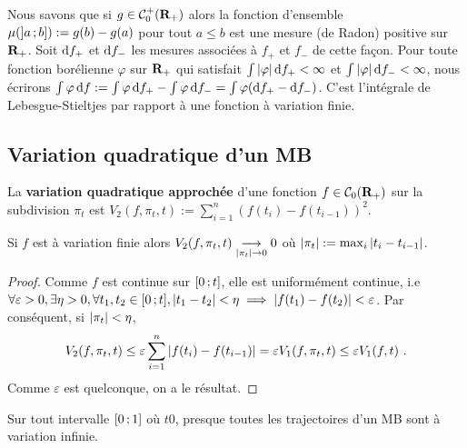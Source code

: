 	Nous savons que si $g \in \mathcal{C}_0^+(\mathbf{R}_+)$ alors la fonction d'ensemble $\mu(\mathopen{}\mathclose{\left]a\mathclose{}\mathpunct{};b\right]}) := g(b) - g(a)$ pour tout $a \leq b$ est une mesure (de Radon) positive sur $\mathbf{R}_+$.
	Soit $\mathop{}\mathopen{}\mathrm{d} f_+$ et $\mathop{}\mathopen{}\mathrm{d} f_-$ les mesures associées à $f_+$ et $f_-$ de cette façon.
	Pour toute fonction borélienne $\varphi$ sur $\mathbf{R}_+$ qui satisfait $\int \left\lvert\varphi\right\rvert \mathop{}\mathopen{}\mathrm{d} f_+ < \infty$ et $\int \left\lvert\varphi\right\rvert \mathop{}\mathopen{}\mathrm{d} f_- < \infty$, nous écrirons $\int \varphi \mathop{}\mathopen{}\mathrm{d} f := \int \varphi \mathop{}\mathopen{}\mathrm{d} f_+ - \int \varphi \mathop{}\mathopen{}\mathrm{d} f_- = \int \varphi (\mathop{}\mathopen{}\mathrm{d} f_+ - \mathop{}\mathopen{}\mathrm{d} f_-)$.
	C'est l'intégrale de Lebesgue-Stieltjes par rapport à une fonction à variation finie.


\subsection{Variation quadratique d'un MB}

	\begin{defn}
		La \textbf{variation quadratique approchée} d'une fonction $f \in \mathcal{C}_0(\mathbf{R}_+)$ sur la subdivision $\pi_t$ est $V_2(f,\pi_t,t) := \sum_{i = 1}^n (f(t_i) - f(t_{i-1}))^2$.
	\end{defn}
	
	\begin{pop}
		Si $f$ est à variation finie alors $V_2(f,\pi_t,t) \underset{\left\lvert\pi_t\right\rvert \to 0}{\longrightarrow} 0$ où $\left\lvert\pi_t\right\rvert := \max_i \left\lvert t_i - t_{i-1}\right\rvert$.
	\end{pop}
	
	\begin{proof}
		Comme $f$ est continue sur $\mathopen{}\mathclose{\left[0\mathclose{}\mathpunct{};t\right]}$, elle est uniformément continue, i.e $\forall \varepsilon > 0, \exists \eta > 0, \forall t_1,t_2 \in \mathopen{}\mathclose{\left[0\mathclose{}\mathpunct{};t\right]}, \left\lvert t_1 - t_2\right\rvert < \eta \implies \left\lvert f(t_1) - f(t_2)\right\rvert < \varepsilon$.
		Par conséquent, si $\left\lvert\pi_t\right\rvert < \eta$,
		$$V_2(f,\pi_t,t) \leq \varepsilon \sum_{i = 1}^n \left\lvert f(t_i) - f(t_{i-1})\right\rvert = \varepsilon V_1(f,\pi_t,t) \leq \varepsilon V_1(f,t)\ .$$
		Comme $\varepsilon$ est quelconque, on a le résultat.
	\end{proof}
	
	\begin{thm}
		Sur tout intervalle $\mathopen{}\mathclose{\left[0\mathclose{}\mathpunct{};1\right]}$ où $t  0$, presque toutes les trajectoires d'un MB sont à variation infinie.
	\end{thm}
	

